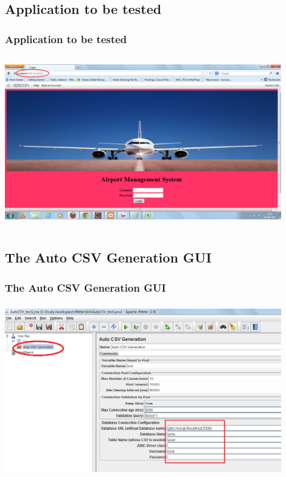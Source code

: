 \documentclass[12pt]{beamer}
\begin{document}
\subsection{Application to be tested}
\begin{frame}[c]
\frametitle{Application to be tested}
\includegraphics[width=12cm, height=7.5cm]{images/ams.png}
\end{frame}

\subsection{The Auto CSV Generation GUI}
\begin{frame}[c]
\frametitle{The Auto CSV Generation GUI}
\includegraphics[width=12cm, height=7.5cm]{images/autocsvgui.png}
\end{frame}

\end{document}
